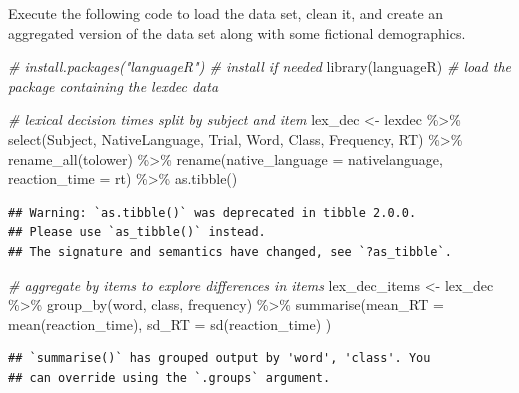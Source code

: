 \documentclass[
]{book}
\newenvironment{Shaded}{\begin{snugshade}}{\end{snugshade}}
\newcommand{\AttributeTok}[1]{\textcolor[rgb]{0.77,0.63,0.00}{#1}}
\newcommand{\CommentTok}[1]{\textcolor[rgb]{0.56,0.35,0.01}{\textit{#1}}}
\newcommand{\FunctionTok}[1]{\textcolor[rgb]{0.00,0.00,0.00}{#1}}
\newcommand{\NormalTok}[1]{#1}
\newcommand{\OtherTok}[1]{\textcolor[rgb]{0.56,0.35,0.01}{#1}}
\newcommand{\SpecialCharTok}[1]{\textcolor[rgb]{0.00,0.00,0.00}{#1}}
\begin{document}
Execute the following code to load the data set, clean it, and create an aggregated version of the data set along with some fictional demographics.

\begin{Shaded}
\begin{Highlighting}[]
\CommentTok{\# install.packages("languageR") \# install if needed}
\FunctionTok{library}\NormalTok{(languageR) }\CommentTok{\# load the package containing the lexdec data}

 \CommentTok{\# lexical decision times split by subject and item}
\NormalTok{lex\_dec }\OtherTok{\textless{}{-}}\NormalTok{ lexdec }\SpecialCharTok{\%\textgreater{}\%}
  \FunctionTok{select}\NormalTok{(Subject, NativeLanguage, Trial, Word, Class, Frequency, RT) }\SpecialCharTok{\%\textgreater{}\%}
  \FunctionTok{rename\_all}\NormalTok{(tolower) }\SpecialCharTok{\%\textgreater{}\%}
  \FunctionTok{rename}\NormalTok{(}\AttributeTok{native\_language =}\NormalTok{ nativelanguage, }\AttributeTok{reaction\_time =}\NormalTok{ rt) }\SpecialCharTok{\%\textgreater{}\%}
  \FunctionTok{as.tibble}\NormalTok{()}
\end{Highlighting}
\end{Shaded}

\begin{verbatim}
## Warning: `as.tibble()` was deprecated in tibble 2.0.0.
## Please use `as_tibble()` instead.
## The signature and semantics have changed, see `?as_tibble`.
\end{verbatim}

\begin{Shaded}
\begin{Highlighting}[]
\CommentTok{\# aggregate by items to explore differences in items}
\NormalTok{lex\_dec\_items }\OtherTok{\textless{}{-}}\NormalTok{ lex\_dec }\SpecialCharTok{\%\textgreater{}\%}
  \FunctionTok{group\_by}\NormalTok{(word, class, frequency) }\SpecialCharTok{\%\textgreater{}\%}
  \FunctionTok{summarise}\NormalTok{(}\AttributeTok{mean\_RT =} \FunctionTok{mean}\NormalTok{(reaction\_time),}
            \AttributeTok{sd\_RT =} \FunctionTok{sd}\NormalTok{(reaction\_time)}
\NormalTok{  )}
\end{Highlighting}
\end{Shaded}

\begin{verbatim}
## `summarise()` has grouped output by 'word', 'class'. You
## can override using the `.groups` argument.
\end{verbatim}
\end{document}

